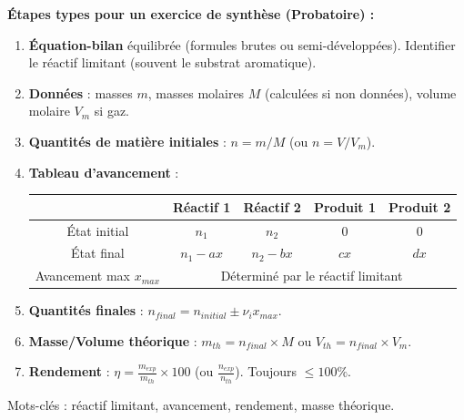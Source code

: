 \documentclass[11pt]{article}
\newcommand{\cle}[1]{{\popxbold\color{popdark}#1}}
\begin{document}
\begin{methode}
\textbf{Étapes types pour un exercice de synthèse (Probatoire) :}
\begin{enumerate}
\item \textbf{Équation-bilan} équilibrée (formules brutes ou semi-développées). Identifier le réactif limitant (souvent le substrat aromatique).
\item \textbf{Données} : masses $m$, masses molaires $M$ (calculées si non données), volume molaire $V_m$ si gaz.
\item \textbf{Quantités de matière initiales} : $n = m/M$ (ou $n = V/V_m$).
\item \textbf{Tableau d'avancement} :
\begin{center}
\begin{tabular}{|c|c|c|c|c|}\hline
 & Réactif 1 & Réactif 2 & Produit 1 & Produit 2 \\\hline
État initial & $n_1$ & $n_2$ & 0 & 0 \\\hline
État final & $n_1 - a x$ & $n_2 - b x$ & $c x$ & $d x$ \\\hline
Avancement max $x_{max}$ & \multicolumn{4}{c|}{Déterminé par le réactif limitant} \\\hline
\end{tabular}
\end{center}
\item \textbf{Quantités finales} : $n_{final} = n_{initial} \pm \nu_i x_{max}$.
\item \textbf{Masse/Volume théorique} : $m_{th} = n_{final} \times M$ ou $V_{th} = n_{final} \times V_m$.
\item \textbf{Rendement} : $\eta = \frac{m_{exp}}{m_{th}} \times 100$ (ou $\frac{n_{exp}}{n_{th}}$). Toujours $\le 100\%$.
\end{enumerate}
\cle{Mots-clés : réactif limitant, avancement, rendement, masse théorique.}
\end{methode}
\end{document}
